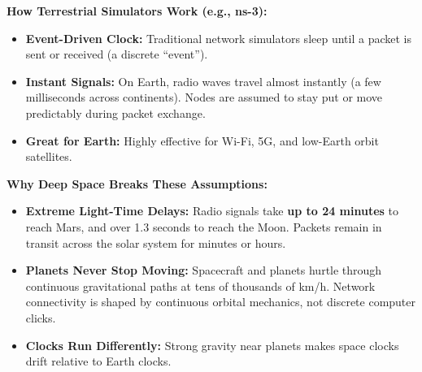 \documentclass[9pt]{article}
\begin{document}
\begin{minipage}[t]{0.32\textwidth}
    \begin{tcolorbox}[posterbox, title=1. The Deep-Space Simulation Challenge, height=15.2cm]
        {\color{darkCyan}\textbf{How Terrestrial Simulators Work (e.g., ns-3):}}
        \begin{itemize}[leftmargin=9pt, itemsep=1.5pt, topsep=1pt]
            \item \textbf{Event-Driven Clock:} Traditional network simulators sleep until a packet is sent or received (a discrete ``event'').
            \item \textbf{Instant Signals:} On Earth, radio waves travel almost instantly (a few milliseconds across continents). Nodes are assumed to stay put or move predictably during packet exchange.
            \item \textbf{Great for Earth:} Highly effective for Wi-Fi, 5G, and low-Earth orbit satellites.
        \end{itemize}

        \vspace{2pt}
        \begin{tcolorbox}[highlightbox]
            {\color{darkCyan}\textbf{Why Deep Space Breaks These Assumptions:}}
            \begin{itemize}[leftmargin=8pt, itemsep=2.5pt, topsep=1pt]
                \item \textbf{Extreme Light-Time Delays:} Radio signals take \textbf{up to 24 minutes} to reach Mars, and over 1.3 seconds to reach the Moon. Packets remain in transit across the solar system for minutes or hours.
                \item \textbf{Planets Never Stop Moving:} Spacecraft and planets hurtle through continuous gravitational paths at tens of thousands of km/h. Network connectivity is shaped by continuous orbital mechanics, not discrete computer clicks.
                \item \textbf{Clocks Run Differently:} Strong gravity near planets makes space clocks drift relative to Earth clocks.
            \end{itemize}
        \end{tcolorbox}


\end{tcolorbox}
\end{minipage}
\end{document}
